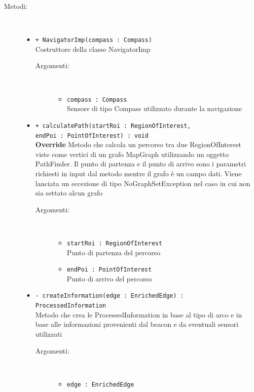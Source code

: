 \documentclass[../DefinizioneDiProdotto.tex]{subfiles}
\begin{document}
\begin{description}
\begin{itemize}
	\end{itemize}
	\item[Metodi:] \
	\begin{itemize}
		\item \texttt{+ NavigatorImp(compass : Compass)}\\
		Costruttore della classe NavigatorImp
		\begin{description}
			\item[Argomenti:] \
			\begin{itemize}
				\item \texttt{compass : Compass}\\
				Sensore di tipo Compass utilizzato durante la navigazione\end{itemize}
		\end{description}
		\item \texttt{+ calculatePath(startRoi : RegionOfInterest, \\ endPoi : PointOfInterest) : void}\\
		\textbf{Override} Metodo che calcola un percorso tra due RegionOfInterest viste come vertici di un grafo MapGraph utilizzando un oggetto PathFinder. Il punto di partenza e il punto di arrivo sono i parametri richiesti in input dal metodo mentre il grafo è un campo dati. Viene lanciata un eccezione di tipo NoGraphSetException nel caso in cui non sia settato alcun grafo
		\begin{description}
			\item[Argomenti:] \
			\begin{itemize}
				\item \texttt{startRoi : RegionOfInterest}\\
				Punto di partenza del percorso\item \texttt{endPoi : PointOfInterest}\\
				Punto di arrivo del percorso\end{itemize}
		\end{description}
		\item \texttt{- createInformation(edge : EnrichedEdge) : ProcessedInformation}\\
		Metodo che crea le ProcessedInformation in base al tipo di arco e in base alle informazioni provenienti dal beacon e da eventuali sensori utilizzati
		\begin{description}
			\item[Argomenti:] \
			\begin{itemize}
				\item \texttt{edge : EnrichedEdge}\\

\end{itemize}
\end{description}
\end{itemize}
\end{description}
\end{document}

